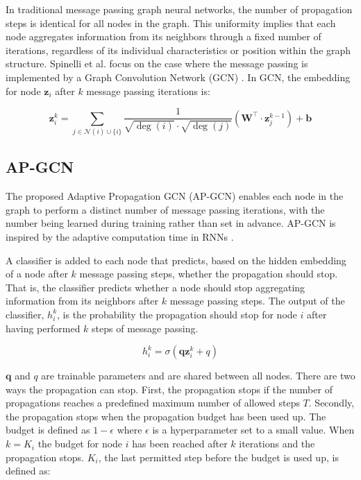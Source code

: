 \documentclass{gdl}
\begin{document}
In traditional message passing graph neural networks, the number of propagation steps is identical for all nodes in the graph. This uniformity implies that each node aggregates information from its neighbors through a fixed number of iterations, regardless of its individual characteristics or position within the graph structure. Spinelli et al. focus on the case where the message passing is implemented by a Graph Convolution Network (GCN) \cite{kipf2017}. In GCN, the embedding for node $\mathbf{z}_i$ after $k$ message passing iterations is:

\begin{equation}
\mathbf{z}_i^{k} = \sum_{j \in \mathcal{N}(i) \cup \{i\}} \frac{1}{\sqrt{\deg(i)} \cdot \sqrt{\deg(j)}} \left( \mathbf{W}^\top \cdot \mathbf{z}_j^{k-1} \right) + \mathbf{b}
\end{equation}

\subsection{AP-GCN}
The proposed Adaptive Propagation GCN (AP-GCN) enables each node in the graph to perform a distinct number of message passing iterations, with the number being learned during training rather than set in advance. AP-GCN is inspired by the adaptive computation time in RNNs \cite{graves2017}.

A classifier is added to each node that predicts, based on the hidden embedding of a node after $k$ message passing steps, whether the propagation should stop. That is, the classifier predicts whether a node should stop aggregating information from its neighbors after $k$ message passing steps. The output of the classifier, $h^k_i$, is the probability the propagation should stop for node $i$ after having performed $k$ steps of message passing.

\begin{equation}
h^k_i = \sigma(\textbf{q}\textbf{z}^k_i + q)
\end{equation}

\noindent $\textbf{q}$ and $q$ are trainable parameters and are shared between all nodes. There are two ways the propagation can stop. First, the propagation stops if the number of propagations reaches a predefined maximum number of allowed steps $T$. Secondly, the propagation stops when the propagation budget has been used up. The budget is defined as $1-\epsilon$ where $\epsilon$ is a hyperparameter set to a small value. When $k=K_i$ the budget for node $i$ has been reached after $k$ iterations and the propagation stops. $K_i$, the last permitted step before the budget is used up, is defined as:
\end{document}
